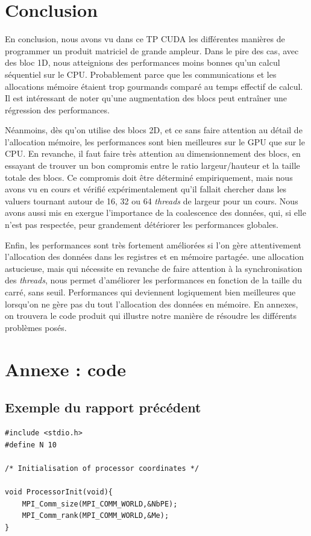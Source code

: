 \documentclass[	DIV=calc,%
							paper=a4,%
							fontsize=11pt%
							]{scrartcl}	 					%
\begin{document}
\section{Conclusion}
En conclusion, nous avons vu dans ce TP CUDA les différentes manières de programmer un produit matriciel de grande ampleur. Dans le pire des cas, avec des bloc 1D, nous atteignions des performances moins bonnes qu'un calcul séquentiel sur le CPU. Probablement parce que les communications et les allocations mémoire étaient trop gourmands comparé au temps effectif de calcul. Il est intéressant de noter qu'une augmentation des blocs peut entraîner une régression des performances.\par
Néanmoins, dès qu'on utilise des blocs 2D, et ce sans faire attention au détail de l'allocation mémoire, les performances sont bien meilleures sur le GPU que sur le CPU. En revanche, il faut faire très attention au dimensionnement des blocs, en essayant de trouver un bon compromis entre le ratio largeur/hauteur et la taille totale des blocs. Ce compromis doit être déterminé empiriquement, mais nous avons vu en cours et vérifié expérimentalement qu'il fallait chercher dans les valuers tournant autour de 16, 32 ou 64 \textit{threads} de largeur pour un cours. Nous avons aussi mis en exergue l'importance de la coalescence des données, qui, si elle n'est pas respectée, peur grandement détériorer les performances globales.\par
Enfin, les performances sont très fortement améliorées si l'on gère attentivement l'allocation des données dans les registres et en mémoire partagée. une allocation astucieuse, mais qui nécessite en revanche de faire attention à la synchronisation des \textit{threads}, nous permet d'améliorer les performances en fonction de la taille du carré, sans seuil. Performances qui deviennent logiquement bien meilleures que lorsqu'on ne gère pas du tout l'allocation des données en mémoire. En annexes, on trouvera le code produit qui illustre notre manière de résoudre les différents problèmes posés.
\newpage

\section{Annexe : code}

\subsection{Exemple du rapport précédent}%
\begin{lstlisting}
#include <stdio.h>
#define N 10

/* Initialisation of processor coordinates */

void ProcessorInit(void){
	MPI_Comm_size(MPI_COMM_WORLD,&NbPE);
  	MPI_Comm_rank(MPI_COMM_WORLD,&Me);
}
\end{lstlisting}
\end{document}
